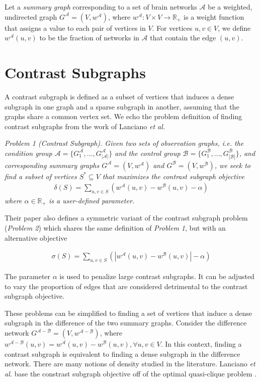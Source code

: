 \documentclass[letterpaper]{article}
\begin{document}
Let a \emph{summary graph} corresponding to a set of brain networks $\mathcal{A}$ be a weighted, undirected graph $G^{\mathcal{A}} = (V, w^{\mathcal{A}})$, where $w^{\mathcal{A}}: V \times V \rightarrow \mathbb{R}_+$ is a weight function that assigns a value to each pair of vertices in $V$.
For vertices $u,v \in V$, we define $w^{\mathcal{A}}(u,v)$ to be the fraction of networks in $\mathcal{A}$ that contain the edge $(u,v)$.

\section{Contrast Subgraphs} \label{cs}

A contrast subgraph is defined as a subset of vertices that induces a dense subgraph in one graph and a sparse subgraph in another, assuming that the graphs share a common vertex set.
We echo the problem definition of finding contrast subgraphs from the work of Lanciano \emph{et al.}

\emph{Problem 1 (Contrast Subgraph). Given two sets of observation graphs, i.e. the condition group $\mathcal{A} = \{G^{\mathcal{A}}_1, . . . , G^{\mathcal{A}}_{|\mathcal{A}|}\}$ and the control group $\mathcal{B} = \{G^{\mathcal{B}}_1, . . . , G^{\mathcal{B}}_{|\mathcal{B}|}\}$, and corresponding summary graphs $G^{\mathcal{A}} = (V, w^{\mathcal{A}})$ and $G^{\mathcal{B}} = (V, w^{\mathcal{B}})$, we seek to find a subset of vertices $S^* \subseteq V$ that maximizes the contrast subgraph objective}
\begin{align*}
    \delta (S) = \sum_{u,v \in S} \left(w^{\mathcal{A}}(u,v) - w^{\mathcal{B}}(u,v) - \alpha\right)
\end{align*}
\emph{where $\alpha \in \mathbb{R}_+$ is a user-defined parameter.}

Their paper also defines a symmetric variant of the contrast subgraph problem (\emph{Problem 2}) which shares the same definition of \emph{Problem 1}, but with an alternative objective

\begin{align*}
    \sigma (S) = \sum_{u,v \in S} \left(|w^{\mathcal{A}}(u,v) - w^{\mathcal{B}}(u,v)| - \alpha\right)
\end{align*}

The parameter $\alpha$ is used to penalize large contrast subgraphs.
It can be adjusted to vary the proportion of edges that are considered detrimental to the contrast subgraph objective.

These problems can be simplified to finding a set of vertices that induce a dense subgraph in the difference of the two summary graphs.
Consider the difference network  $G^{\mathcal{A} - \mathcal{B}} = (V, w^{\mathcal{A} - \mathcal{B}})$, where \\ $w^{\mathcal{A} - \mathcal{B}}(u,v) = w^{\mathcal{A}}(u,v) - w^{\mathcal{B}}(u,v), \forall u,v \in V$.
In this context, finding a contrast subgraph is equivalent to finding a dense subgraph in the difference network.
There are many notions of density studied in the literature.
Lanciano \emph{et al.} base the constrast subgraph objective off of the optimal quasi-clique problem \cite{tsourakakis2013}.
\end{document}
